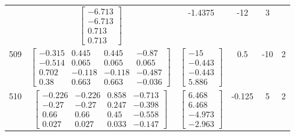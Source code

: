 \documentclass[a4paper,12pt]{article}
\begin{document}
\begin{tabular}{c c c c c c}
&
$\begin{bmatrix} -6.713 \\ -6.713 \\ 0.713 \\ 0.713 \end{bmatrix}$
&
-1.4375
&
-12
&
3
\\
509
&
$\begin{bmatrix} -0.315 & 0.445 & 0.445 & -0.87 \\ -0.514 & 0.065 & 0.065 & 0.065 \\ 0.702 & -0.118 & -0.118 & -0.487 \\ 0.38 & 0.663 & 0.663 & -0.036 \end{bmatrix}$
&
$\begin{bmatrix} -15 \\ -0.443 \\ -0.443 \\ 5.886 \end{bmatrix}$
&
0.5
&
-10
&
2
\\
510
&
$\begin{bmatrix} -0.226 & -0.226 & 0.858 & -0.713 \\ -0.27 & -0.27 & 0.247 & -0.398 \\ 0.66 & 0.66 & 0.45 & -0.558 \\ 0.027 & 0.027 & 0.033 & -0.147 \end{bmatrix}$
&
$\begin{bmatrix} 6.468 \\ 6.468 \\ -4.973 \\ -2.963 \end{bmatrix}$
&
-0.125
&
5
&
2
\\
\end{tabular} \egroup \newpage
\end{document}
